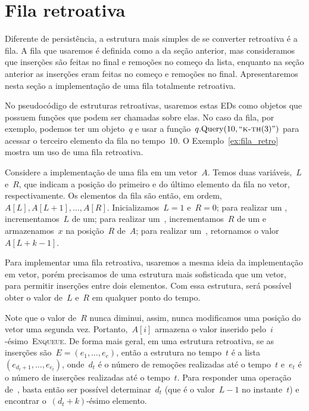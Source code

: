 \documentclass[quali.tex]{subfile}
\begin{document}
\section{Fila retroativa}

Diferente de persistência, a estrutura mais simples de se converter retroativa é a fila. A fila que usaremos é definida como a da seção anterior, mas consideramos que inserções são feitas no final e remoções no começo da lista, enquanto na seção anterior as inserções eram feitas no começo e remoções no final. Apresentaremos nesta seção a implementação de uma fila totalmente retroativa.

No pseudocódigo de estruturas retroativas, usaremos estas EDs como objetos que possuem funções que podem ser chamadas sobre elas. No caso da fila, por exemplo, podemos ter um objeto~$q$ e usar a função~$q.\text{Query}(10, ``\textsc{k-th}(3)")$ para acessar o terceiro elemento da fila no tempo~10. O Exemplo~\ref{ex:fila_retro} mostra um uso de uma fila retroativa.

Considere a implementação de uma fila em um vetor~$A$. Temos duas variáveis,~$L$ e~$R$, que indicam a posição do primeiro e do último elemento da fila no vetor, respectivamente. Os elementos da fila são então, em ordem,~$A[L], A[L + 1], \ldots, A[R]$. Inicializamos~$L = 1$ e~$R = 0$; para realizar um , incrementamos~$L$ de um; para realizar um~, incrementamos~$R$ de um e armazenamos~$x$ na posição~$R$ de~$A$; para realizar um~, retornamos o valor~$A[L + k - 1]$.

Para implementar uma fila retroativa, usaremos a mesma ideia da implementação em vetor, porém precisamos de uma estrutura mais sofisticada que um vetor, para permitir inserções entre dois elementos. Com essa estrutura, será possível obter o valor de~$L$ e~$R$ em qualquer ponto do tempo.

Note que o valor de~$R$ nunca diminui, assim, nunca modificamos uma posição do vetor uma segunda vez. Portanto,~$A[i]$ armazena o valor inserido pelo~$i$-ésimo~\textsc{Enqueue}. De forma mais geral, em uma estrutura retroativa, se as inserções são~$E = (e_1, \ldots, e_e)$, então a estrutura no tempo~$t$ é a lista~$(e_{d_t+1}, \ldots, e_{e_t})$, onde~$d_t$ é o número de remoções realizadas até o tempo~$t$ e~$e_t$ é o número de inserções realizadas até o tempo~$t$. Para responder uma operação de~, basta então ser possível determinar~$d_t$ (que é o valor~$L - 1$ no instante~$t$) e encontrar o~$(d_t + k)$-ésimo elemento.
\end{document}
